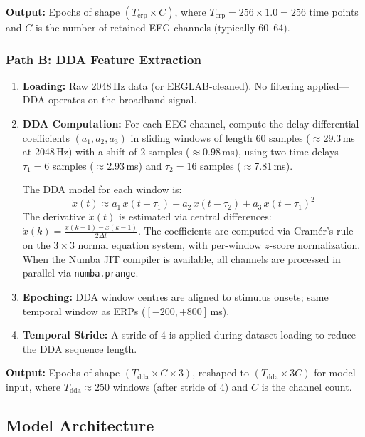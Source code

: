 \documentclass[11pt,a4paper]{article}
\begin{document}
\textbf{Output:} Epochs of shape $(T_{\mathrm{erp}} \times C)$, where
$T_{\mathrm{erp}} = 256 \times 1.0 = 256$ time points and $C$ is the number of
retained EEG channels (typically 60--64).

\subsubsection{Path B: DDA Feature Extraction}

\begin{enumerate}
  \item \textbf{Loading:} Raw 2048\,Hz data (or EEGLAB-cleaned). No filtering
    applied---DDA operates on the broadband signal.
  \item \textbf{DDA Computation:} For each EEG channel, compute the
    delay-differential coefficients $(a_1, a_2, a_3)$ in sliding windows of
    length 60 samples ($\approx$29.3\,ms at 2048\,Hz) with a shift of 2 samples
    ($\approx$0.98\,ms), using two time delays $\tau_1 = 6$ samples
    ($\approx$2.93\,ms) and $\tau_2 = 16$ samples ($\approx$7.81\,ms).

    The DDA model for each window is:
    \[
      \dot{x}(t) \approx a_1\,x(t - \tau_1) + a_2\,x(t - \tau_2)
                        + a_3\,x(t - \tau_1)^2
    \]
    The derivative $\dot{x}(t)$ is estimated via central differences:
    $\dot{x}(k) = \frac{x(k+1) - x(k-1)}{2\Delta t}$.
    The coefficients are computed via Cram\'er's rule on the $3 \times 3$
    normal equation system, with per-window $z$-score normalization. When the
    Numba JIT compiler is available, all channels are processed in parallel via
    \texttt{numba.prange}.
  \item \textbf{Epoching:} DDA window centres are aligned to stimulus onsets;
    same temporal window as ERPs ($[-200, +800]$\,ms).
  \item \textbf{Temporal Stride:} A stride of 4 is applied during dataset
    loading to reduce the DDA sequence length.
\end{enumerate}

\textbf{Output:} Epochs of shape $(T_{\mathrm{dda}} \times C \times 3)$,
reshaped to $(T_{\mathrm{dda}} \times 3C)$ for model input, where
$T_{\mathrm{dda}} \approx 250$ windows (after stride of 4) and $C$ is the
channel count.

\subsection{Model Architecture}
\end{document}
